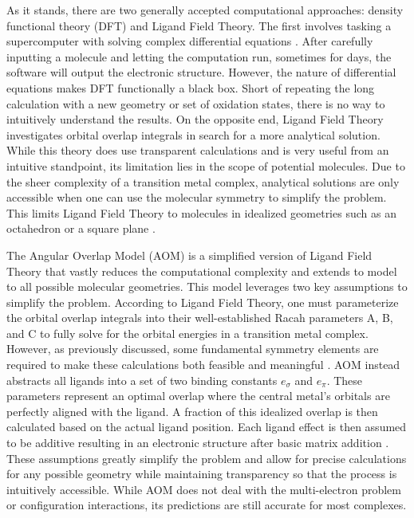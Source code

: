 \documentclass[10pt,twocolumn]{article}
\begin{document}
As it stands, there are two generally accepted computational approaches: density functional theory (DFT) and Ligand Field Theory. The first involves tasking a supercomputer with solving complex differential equations \cite{webmo}. After carefully inputting a molecule and letting the computation run, sometimes for days, the software will output the electronic structure. However, the nature of differential equations makes DFT functionally a black box. Short of repeating the long calculation with a new geometry or set of oxidation states, there is no way to intuitively understand the results. On the opposite end, Ligand Field Theory investigates orbital overlap integrals in search for a more analytical solution. While this theory does use transparent calculations and is very useful from an intuitive standpoint, its limitation lies in the scope of potential molecules. Due to the sheer complexity of a transition metal complex, analytical solutions are only accessible when one can use the molecular symmetry to simplify the problem. This limits Ligand Field Theory to molecules in idealized geometries such as an octahedron or a square plane \cite{larsen1974}.

The Angular Overlap Model (AOM) is a simplified version of Ligand Field Theory that vastly reduces the computational complexity and extends to model to all possible molecular geometries. This model leverages two key assumptions to simplify the problem. According to Ligand Field Theory, one must parameterize the orbital overlap integrals into their well-established Racah parameters A, B, and C to fully solve for the orbital energies in a transition metal complex. However, as previously discussed, some fundamental symmetry elements are required to make these calculations both feasible and meaningful \cite{underhill1966}. AOM instead abstracts all ligands into a set of two binding constants $e_\sigma$ and $e_\pi$. These parameters represent an optimal overlap where the central metal’s orbitals are perfectly aligned with the ligand. A fraction of this idealized overlap is then calculated based on the actual ligand position. Each ligand effect is then assumed to be additive resulting in an electronic structure after basic matrix addition \cite{larsen1974}. These assumptions greatly simplify the problem and allow for precise calculations for any possible geometry while maintaining transparency so that the process is intuitively accessible. While AOM does not deal with the multi-electron problem or configuration interactions, its predictions are still accurate for most complexes.
\end{document}
